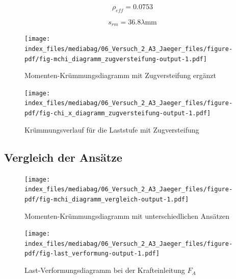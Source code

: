 \documentclass[
  12pt,
  letterpaper,
  egregdoesnotlikesansseriftitles]{scrreprt}
\begin{document}
\begin{equation}\rho_{eff} = 0.0753\end{equation}

\begin{equation}s_{rm} = 36.8 \lambda \text{mm}\end{equation}

\begin{figure}[H]

{\centering \texttt{[image: index\_files/mediabag/06\_Versuch\_2\_A3\_Jaeger\_files/figure-pdf/fig-mchi\_diagramm\_zugversteifung-output-1.pdf]}

}

\caption{\label{fig-mchi_diagramm_zugversteifung}Momenten-Krümmungsdiagramm
mit Zugversteifung ergänzt}

\end{figure}

\begin{figure}[H]

{\centering \texttt{[image: index\_files/mediabag/06\_Versuch\_2\_A3\_Jaeger\_files/figure-pdf/fig-chi\_x\_diagramm\_zugversteifung-output-1.pdf]}

}

\caption{\label{fig-chi_x_diagramm_zugversteifung}Krümmungsverlauf für
die Laststufe mit Zugversteifung}

\end{figure}

\hypertarget{vergleich-der-ansuxe4tze}{%
\subsection{Vergleich der Ansätze}\label{vergleich-der-ansuxe4tze}}

\begin{figure}[H]

{\centering \texttt{[image: index\_files/mediabag/06\_Versuch\_2\_A3\_Jaeger\_files/figure-pdf/fig-mchi\_diagramm\_vergleich-output-1.pdf]}

}

\caption{\label{fig-mchi_diagramm_vergleich}Momenten-Krümmungsdiagramm
mit unterschiedlichen Ansätzen}

\end{figure}

\begin{figure}[H]

{\centering \texttt{[image: index\_files/mediabag/06\_Versuch\_2\_A3\_Jaeger\_files/figure-pdf/fig-last\_verformung-output-1.pdf]}

}

\caption{\label{fig-last_verformung}Last-Verformungsdiagramm bei der
Krafteinleitung \(F_A\)}

\end{figure}
\end{document}
